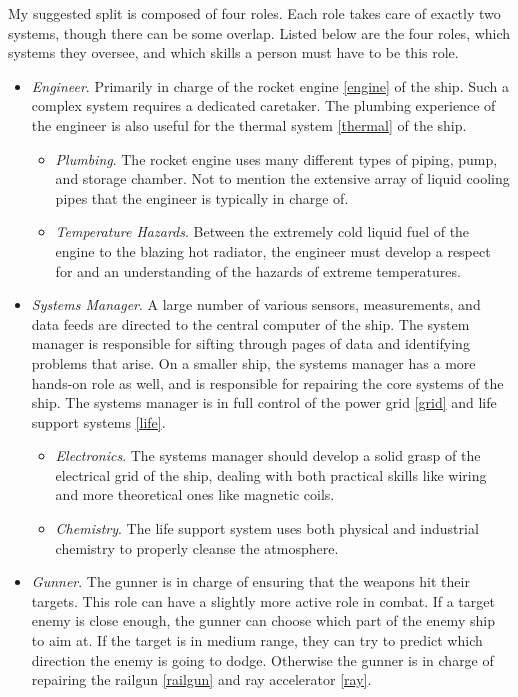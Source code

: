 \documentclass[a4paper]{article}
\begin{document}
My suggested split is composed of four roles. Each role takes care of exactly two systems, though there can be some overlap. Listed below are the four roles, which systems they oversee, and which skills a person must have to be this role.
\begin{itemize}
\item \textit{Engineer}. Primarily in charge of the rocket engine \ref{engine} of the ship. Such a complex system requires a dedicated caretaker. The plumbing experience of the engineer is also useful for the thermal system \ref{thermal} of the ship.
\begin{itemize}
\item \textit{Plumbing}. The rocket engine uses many different types of piping, pump, and storage chamber. Not to mention the extensive array of liquid cooling pipes that the engineer is typically in charge of.
\item \textit{Temperature Hazards}. Between the extremely cold liquid fuel of the engine to the blazing hot radiator, the engineer must develop a respect for and an understanding of the hazards of extreme temperatures.
\end{itemize}
\item \textit{Systems Manager}. A large number of various sensors, measurements, and data feeds are directed to the central computer of the ship. The system manager is responsible for sifting through pages of data and identifying problems that arise. On a smaller ship, the systems manager has a more hands-on role as well, and is responsible for repairing the core systems of the ship. The systems manager is in full control of the power grid \ref{grid} and life support systems \ref{life}.
\begin{itemize}
\item \textit{Electronics}. The systems manager should develop a solid grasp of the electrical grid of the ship, dealing with both practical skills like wiring and more theoretical ones like magnetic coils.
\item \textit{Chemistry}. The life support system uses both physical and industrial chemistry to properly cleanse the atmosphere. 
\end{itemize}
\item \textit{Gunner}. The gunner is in charge of ensuring that the weapons hit their targets. This role can have a slightly more active role in combat. If a target enemy is close enough, the gunner can choose which part of the enemy ship to aim at. If the target is in medium range, they can try to predict which direction the enemy is going to dodge. Otherwise the gunner is in charge of repairing the railgun \ref{railgun} and ray accelerator \ref{ray}.

\end{itemize}
\end{document}
